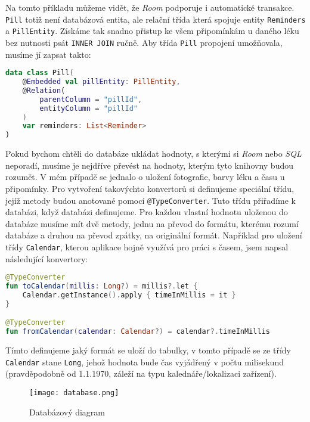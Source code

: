 \documentclass[../TakeYourPill.tex]{subfiles}
\begin{document}
Na tomto příkladu můžeme vidět, že \textit{Room} podporuje i automatické transakce. \texttt{Pill} totiž není databázová entita, ale relační třída která spojuje entity \texttt{Reminders} a \texttt{PillEntity}. Získáme tak snadno přistup ke všem připomínkám u daného léku bez nutnosti psát \texttt{INNER JOIN} ručně. Aby třída \texttt{Pill} propojení umožňovala, musíme jí zapsat takto:

\setmonofont{JetBrains Mono}
\begin{lstlisting}[language=Kotlin]
data class Pill(
    @Embedded val pillEntity: PillEntity,
    @Relation(
        parentColumn = "pillId",
        entityColumn = "pillId"
    )
    var reminders: List<Reminder>
)
\end{lstlisting}
\setmonofont{Latin Modern Mono}

Pokud bychom chtěli do databáze ukládat hodnoty, s kterými si \textit{Room} nebo \textit{SQL} neporadí, musíme je nejdříve převést na hodnoty, kterým tyto knihovny budou rozumět. V mém případě se jednalo o uložení fotografie, barvy léku a času u připomínky. Pro vytvoření takovýchto konvertorů si definujeme speciální třídu, jejíž metody budou anotované pomocí \texttt{@TypeConverter}. Tuto třídu přiřadíme k databázi, když databázi definujeme. Pro každou vlastní hodnotu uloženou do databáze musíme mít dvě metody, jednu na převod do formátu, kterému rozumí databáze a druhou na převod zpátky, na originální formát. Například pro uložení třídy \texttt{Calendar}, kterou aplikace hojně využívá pro práci s časem, jsem napsal následující konvertory:

\begin{minipage}{\linewidth}
\setmonofont{JetBrains Mono}
\begin{lstlisting}[language=Kotlin]
@TypeConverter
fun toCalendar(millis: Long?) = millis?.let {
    Calendar.getInstance().apply { timeInMillis = it }
}

@TypeConverter
fun fromCalendar(calendar: Calendar?) = calendar?.timeInMillis
\end{lstlisting}
\setmonofont{Latin Modern Mono}
\end{minipage}

Tímto definujeme jaký formát se uloží do tabulky, v tomto případě se ze třídy \texttt{Calendar} stane \texttt{Long}, jehož hodnota bude čas vyjádřený v počtu milisekund (pravděpodobně od 1.1.1970, záleží na typu kalednáře/lokalizaci zařízení). 

\begin{figure}[h]
\centering
\texttt{[image: database.png]}
\caption{Databázový diagram}
\end{figure}
\end{document}
